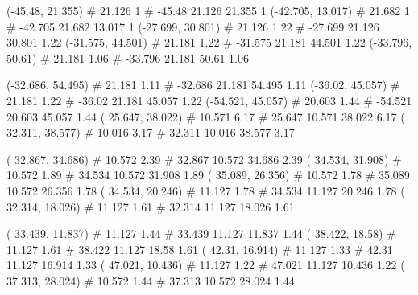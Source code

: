 \documentclass[a4paper,openbib,10pt]{article}
\newenvironment{treegraph}{\begin{graph}}{\end{graph}}
\begin{document}
\begin{treegraph}
  (-45.48, 21.355) #     21.126    1
   #    -45.48    21.126    21.355    1
  (-42.705, 13.017) #     21.682    1
   #    -42.705    21.682    13.017    1
  (-27.699, 30.801) #     21.126    1.22
   #    -27.699    21.126    30.801    1.22
  (-31.575, 44.501) #     21.181    1.22
   #    -31.575    21.181    44.501    1.22
  (-33.796, 50.61) #     21.181    1.06
   #    -33.796    21.181    50.61    1.06

  (-32.686, 54.495) #     21.181    1.11
   #    -32.686    21.181    54.495    1.11
  (-36.02, 45.057) #     21.181    1.22
   #    -36.02    21.181    45.057    1.22
  (-54.521, 45.057) #     20.603    1.44
   #    -54.521    20.603    45.057    1.44
  ( 25.647, 38.022) #     10.571    6.17
   #    25.647    10.571    38.022    6.17
  ( 32.311, 38.577) #     10.016    3.17
   #    32.311    10.016    38.577    3.17

  ( 32.867, 34.686) #     10.572    2.39
   #    32.867    10.572    34.686    2.39
  ( 34.534, 31.908) #     10.572    1.89
   #    34.534    10.572    31.908    1.89
  ( 35.089, 26.356) #     10.572    1.78
   #    35.089    10.572    26.356    1.78
  ( 34.534, 20.246) #     11.127    1.78
   #    34.534    11.127    20.246    1.78
  ( 32.314, 18.026) #     11.127    1.61
   #    32.314    11.127    18.026    1.61

  ( 33.439, 11.837) #     11.127    1.44
   #    33.439    11.127    11.837    1.44
  ( 38.422, 18.58) #     11.127    1.61
   #    38.422    11.127    18.58    1.61
  ( 42.31, 16.914) #     11.127    1.33
   #    42.31    11.127    16.914    1.33
  ( 47.021, 10.436) #     11.127    1.22
   #    47.021    11.127    10.436    1.22
  ( 37.313, 28.024) #     10.572    1.44
   #    37.313    10.572    28.024    1.44


\end{treegraph}
\end{document}

